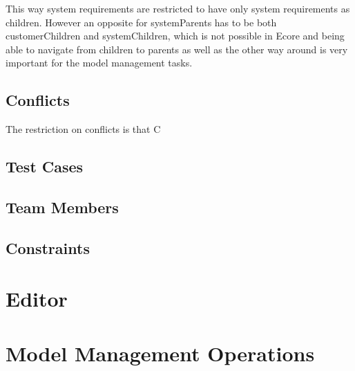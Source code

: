 \documentclass[11pt,a4paper]{scrartcl}
\begin{document}
	This way system requirements are restricted to have only system requirements as children. However an opposite for systemParents has to be both customerChildren and systemChildren, which is not possible in Ecore and being able to navigate from children to parents as well as the other way around is very important for the model management tasks.
	
	\subsection{Conflicts}
	The restriction on conflicts is that C
	
	\subsection{Test Cases}
	
	\subsection{Team Members}
	
	\subsection{Constraints}


\section{Editor}


\section{Model Management Operations}

	
\end{document}

